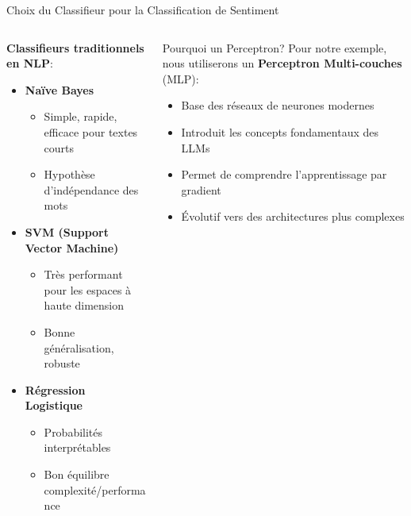 \documentclass[aspectratio=169,11pt]{beamer}
\begin{document}
\begin{frame}{Choix du Classifieur pour la Classification de Sentiment}
    \begin{columns}
        \begin{column}{0.55\textwidth}
            \textbf{Classifieurs traditionnels en NLP}:
            \begin{itemize}
                \item \textbf{Naïve Bayes}
                \begin{itemize}
                    \item Simple, rapide, efficace pour textes courts
                    \item Hypothèse d'indépendance des mots
                \end{itemize}
                \vspace{0.2cm}
                \item \textbf{SVM (Support Vector Machine)}
                \begin{itemize}
                    \item Très performant pour les espaces à haute dimension
                    \item Bonne généralisation, robuste
                \end{itemize}
                \vspace{0.2cm}
                \item \textbf{Régression Logistique}
                \begin{itemize}
                    \item Probabilités interprétables
                    \item Bon équilibre complexité/performance
                \end{itemize}
            \end{itemize}
        \end{column}
        \begin{column}{0.45\textwidth}
            \begin{exampleblock}{Pourquoi un Perceptron?}
                Pour notre exemple, nous utiliserons un \textbf{Perceptron Multi-couches} (MLP):
                \begin{itemize}
                    \item Base des réseaux de neurones modernes
                    \item Introduit les concepts fondamentaux des LLMs
                    \item Permet de comprendre l'apprentissage par gradient
                    \item Évolutif vers des architectures plus complexes
                \end{itemize}
            \end{exampleblock}
        \end{column}
    \end{columns}
\end{frame}
\end{document}
